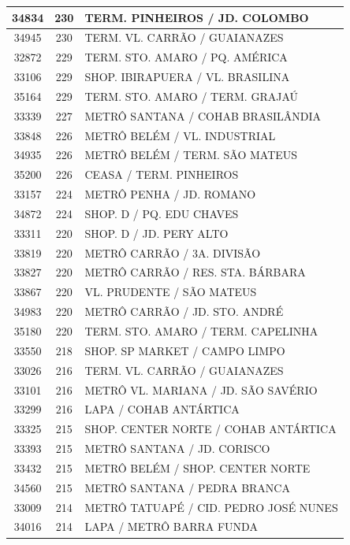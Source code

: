 \documentclass[
	12pt,				%
	oneside,			%
	a4paper,			%
	english,			%
	brazil				%
	]{abntex2ppgsi}
\begin{document}
{{{\begin{apendicesenv}
\begin{longtable}{c|c|p{7cm}}
 \hline 
34834 &	230 &	TERM. PINHEIROS / JD. COLOMBO \\ 
 \hline 
34945 &	230 &	TERM. VL. CARRÃO / GUAIANAZES \\ 
 \hline 
32872 &	229 &	TERM. STO. AMARO / PQ. AMÉRICA \\ 
 \hline 
33106 &	229 &	SHOP. IBIRAPUERA / VL. BRASILINA \\ 
 \hline 
35164 &	229 &	TERM. STO. AMARO / TERM. GRAJAÚ \\ 
 \hline 
33339 &	227 &	METRÔ SANTANA / COHAB BRASILÂNDIA \\ 
 \hline 
33848 &	226 &	METRÔ BELÉM / VL. INDUSTRIAL \\ 
 \hline 
34935 &	226 &	METRÔ BELÉM / TERM. SÃO MATEUS \\ 
 \hline 
35200 &	226 &	CEASA / TERM. PINHEIROS \\ 
 \hline 
33157 &	224 &	METRÔ PENHA / JD. ROMANO \\ 
 \hline 
34872 &	224 &	SHOP. D / PQ. EDU CHAVES \\ 
 \hline 
33311 &	220 &	SHOP. D / JD. PERY ALTO \\ 
 \hline 
33819 &	220 &	METRÔ CARRÃO / 3A. DIVISÃO \\ 
 \hline 
33827 &	220 &	METRÔ CARRÃO / RES. STA. BÁRBARA \\ 
 \hline 
33867 &	220 &	VL. PRUDENTE / SÃO MATEUS \\ 
 \hline 
34983 &	220 &	METRÔ CARRÃO / JD. STO. ANDRÉ \\ 
 \hline 
35180 &	220 &	TERM. STO. AMARO / TERM. CAPELINHA \\ 
 \hline 
33550 &	218 &	SHOP. SP MARKET / CAMPO LIMPO \\ 
 \hline 
33026 &	216 &	TERM. VL. CARRÃO / GUAIANAZES \\ 
 \hline 
33101 &	216 &	METRÔ VL. MARIANA / JD. SÃO SAVÉRIO \\ 
 \hline 
33299 &	216 &	LAPA / COHAB ANTÁRTICA \\ 
 \hline 
33325 &	215 &	SHOP. CENTER NORTE / COHAB ANTÁRTICA \\ 
 \hline 
33393 &	215 &	METRÔ SANTANA / JD. CORISCO \\ 
 \hline 
33432 &	215 &	METRÔ BELÉM / SHOP. CENTER NORTE \\ 
 \hline 
34560 &	215 &	METRÔ SANTANA / PEDRA BRANCA \\ 
 \hline 
33009 &	214 &	METRÔ TATUAPÉ / CID. PEDRO JOSÉ NUNES \\ 
 \hline 
34016 &	214 &	LAPA / METRÔ BARRA FUNDA \\ 

\end{longtable}
\end{apendicesenv}}}}
\end{document}
